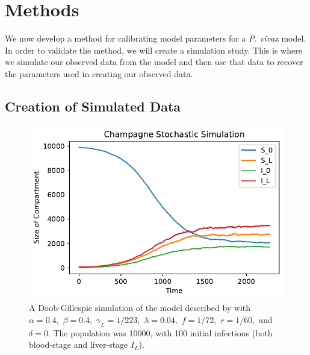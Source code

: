 \chapter{Methods}

We now develop a method for calibrating model parameters for a \emph{P. vivax}
model. In order to validate the method, we will create a simulation study. This is
where we simulate our observed data from the model and then use that data
to recover the parameters used in creating our observed data.

\section{Creation of Simulated Data}

\begin{figure}[htbp]
    \centering
    \includegraphics[width = \textwidth]{
        ../champagne_GP_images/champagne_simulation.pdf
    }
    \caption[{
                Gillespie simulation of the Champagne model
            }]{
        A Doob-Gillespie simulation of the model described by
        \cite{champagne_using_2022} with $\alpha = 0.4,$ $\beta = 0.4,$
        $\gamma_L = 1 / 223,$ $\lambda = 0.04,$ $f = 1 / 72,$ $r = 1 / 60,$ and
        $\delta = 0.$ The population was 10000, with 100 initial infections
        (both blood-stage and liver-stage $I_L$).
    }
    \label{fig:champ_doob}
\end{figure}

